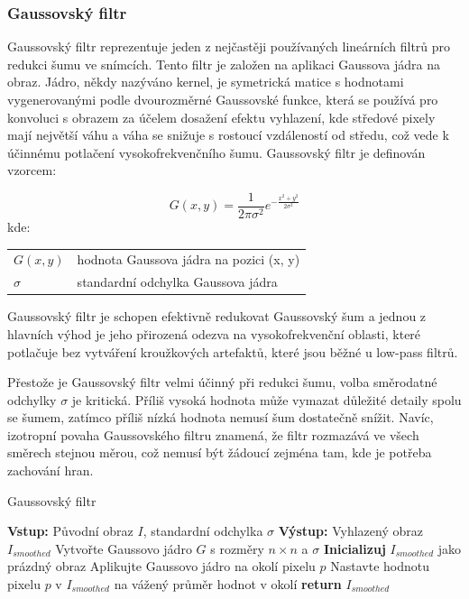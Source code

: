 \documentclass[male,czech,api_ing]{thesis}
\makeatletter
\newenvironment{conditions}[1][kde:]
    {#1 \begin{tabular}[t]{>{$}l<{$} @{${}={}$} >{\raggedright\arraybackslash}p{10cm}}}
    {\end{tabular}}
\makeatother
\begin{document}
\subsubsection{Gaussovský filtr}
Gaussovský filtr reprezentuje jeden z nejčastěji používaných lineárních filtrů pro redukci šumu ve snímcích. Tento filtr je založen na aplikaci Gaussova jádra na obraz. Jádro, někdy nazýváno kernel, je symetrická matice s hodnotami vygenerovanými podle dvourozměrné Gaussovské funkce, která se používá pro konvoluci s obrazem za účelem dosažení efektu vyhlazení, kde středové pixely mají největší váhu a váha se snižuje s rostoucí vzdáleností od středu, což vede k účinnému potlačení vysokofrekvenčního šumu. Gaussovský filtr je definován vzorcem:

\begin{equation}
    G(x, y) = \frac{1}{2\pi\sigma^2} e^{-\frac{x^2 + y^2}{2\sigma^2}}
\end{equation}
\begin{conditions}
    G(x, y) & hodnota Gaussova jádra na pozici (x, y) \\
    \sigma & standardní odchylka Gaussova jádra
\end{conditions}

Gaussovský filtr je schopen efektivně redukovat Gaussovský šum a jednou z hlavních výhod je jeho přirozená odezva na vysokofrekvenční oblasti, které potlačuje bez vytváření kroužkových artefaktů, které jsou běžné u low-pass filtrů.

Přestože je Gaussovský filtr velmi účinný při redukci šumu, volba směrodatné odchylky $\sigma$ je kritická. Příliš vysoká hodnota může vymazat důležité detaily spolu se šumem, zatímco příliš nízká hodnota nemusí šum dostatečně snížit. Navíc, izotropní povaha Gaussovského filtru znamená, že filtr rozmazává ve všech směrech stejnou měrou, což nemusí být žádoucí zejména tam, kde je potřeba zachování hran. \cite{XRayImageProcessing}

\begin{algorithm}
    \caption{Gaussovský filtr}
    \begin{algorithmic}[1]
        \State \textbf{Vstup:} Původní obraz $I$, standardní odchylka $\sigma$
        \State \textbf{Výstup:} Vyhlazený obraz $I_{smoothed}$
        \State Vytvořte Gaussovo jádro $G$ s rozměry $n \times n$ a $\sigma$
        \State \textbf{Inicializuj} $I_{smoothed}$ jako prázdný obraz
            \State Aplikujte Gaussovo jádro na okolí pixelu $p$
            \State Nastavte hodnotu pixelu $p$ v $I_{smoothed}$ na vážený průměr hodnot v okolí
        \EndFor
        \State \textbf{return} $I_{smoothed}$
    \end{algorithmic}
\end{algorithm}
\end{document}
